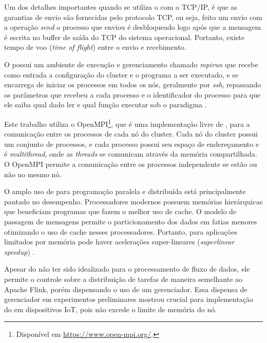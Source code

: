 Um dos detalhes importantes quando se utiliza o \mpi com o TCP/IP, é que as
garantias de envio são fornecidas pelo protocolo TCP, ou seja, feito um envio
com a operação \emph{send} o processo que enviou é desbloqueado logo após que a
mensagem é escrita no buffer de saída do TCP do sistema operacional. Portanto,
existe tempo de voo (\emph{time of flight}) entre o envio e recebimento.

O \mpi possui um ambiente de execução e gerenciamento chamado \emph{mpirun} que
recebe como entrada a configuração do cluster e o programa a ser executado, e se
encarrega de iniciar os processos em todos os nós, geralmente por \emph{ssh},
repassando os parâmetros que recebeu a cada processo e o identificador do
processo para que ele saiba qual dado ler e qual função executar sob o paradigma
\spmd.

Este trabalho utiliza o OpenMPI\footnote{Disponível em \url{https://www.open-mpi.org/}.}, que é uma implementação livre de \mpi, para a
comunicação entre os processos de cada nó do cluster.
Cada nó do cluster possui um conjunto de processos, e cada processo possui seu
espaço de endereçamento e é \emph{multithread}, onde as \emph{threads} se comunicam
através da memória compartilhada.
O OpenMPI permite a comunicação entre os processos independente se estão ou não
no mesmo nó.


O amplo uso de \mpi para programação paralela e distribuída está principalmente pautado no
desempenho. Processadores modernos possuem memórias hierárquicas que beneficiam
programas que fazem o melhor uso de cache. O modelo de passagem de mensagens
permite o particionamento dos dados em fatias menores otimizando o uso de cache
nesses processadores. Portanto, para aplicações limitados por memória pode haver
acelerações super-lineares (\emph{superlinear speedup}) \cite{mpi-book}.

Apesar do \mpi não ter sido idealizado para o processamento de fluxo de dados, ele
permite o controle sobre a distribuição de tarefas de maneira
semelhante ao Apache Flink, porém dispensando o uso de um
gerenciador. Essa dispensa de gerenciador em experimentos preliminares mostrou
crucial para implementação do \mfog em dispositivos IoT, pois não excede o limite de
memória do nó.

